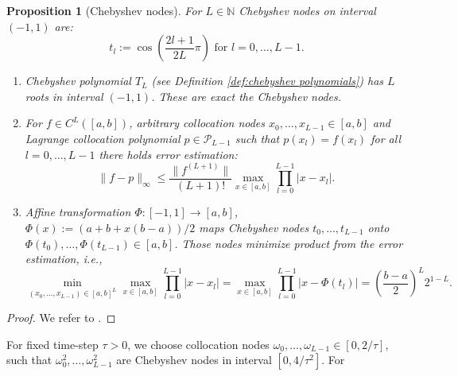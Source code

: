 \documentclass[a4paper,11pt,bibliography=totoc,listof=totoc,headinclude=true,cleardoublepage=empty,oneside]{scrbook}
\newtheorem{prop}[theorem]{Proposition}
\newcommand{\N}{\mathbb{N}}
\begin{document}
\begin{prop}[Chebyshev nodes] \label{def:chebyshev nodes}
    For $L\in\N$ Chebyshev nodes on interval $(-1, 1)$ are:
    \begin{equation*}
        t_l := \cos\left(\frac{2l+1}{2L}\pi\right) \text{ for } l = 0, \dots, L-1.
    \end{equation*}
    \begin{enumerate}
        \item Chebyshev polynomial $T_L$ (see Definition \ref{def:chebyshev polynomials}) has $L$ roots in interval $(-1, 1)$. These are exact the Chebyshev nodes.
        \item For $f \in C^{L}\left([a,b]\right)$, arbitrary collocation nodes $x_0, \dots, x_{L-1} \in [a,b]$ and Lagrange collocation polynomial $p\in \mathcal{P}_{L-1}$ such that $p(x_l) = f(x_l)$ for all $l=0, \dots, L-1$ there holds error estimation:
        \begin{equation*}
            \|f-p\|_\infty \leqslant \frac{\|f^{(L+1)}\|}{(L+1)!} \max_{x\in[a,b]} \prod_{l=0}^{L-1} \left|x-x_l\right|.
        \end{equation*}
        \item Affine transformation $\Phi: [-1, 1] \rightarrow [a,b]$, $\Phi(x) := \left(a+b+x(b-a)\right)/2$ maps Chebyshev nodes $t_0, \dots, t_{L-1}$ onto $\Phi(t_0), \dots, \Phi(t_{L-1}) \in [a,b]$. Those nodes minimize product from the error estimation, i.e.,
        \begin{equation*}
            \min_{(x_0, \dots, x_{L-1})\in [a,b]^L}  \max_{x\in[a,b]} \prod_{l=0}^{L-1} \left|x-x_l\right| =  \max_{x\in[a,b]} \prod_{l=0}^{L-1} \left|x-\Phi(t_l)\right| = \left(\frac{b-a}{2}\right)^{L} 2^{1-L}.
        \end{equation*}
    \end{enumerate}
\end{prop}
\begin{proof}
    We refer to \cite[p. 23--24]{numericsAB}.
\end{proof}

For fixed time-step $\tau>0$, we choose collocation nodes $\omega_0, \dots, \omega_{L-1} \in \left[0, 2/\tau\right]$, such that $\omega_0^2, \dots, \omega_{L-1}^2$ are Chebyshev nodes in interval $\left[0, 4/\tau^2\right]$. For 


 
%

\end{document}

